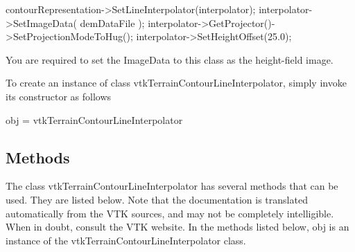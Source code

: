 \begin{DoxyVerb} contourRepresentation->SetLineInterpolator(interpolator);
 interpolator->SetImageData( demDataFile );
 interpolator->GetProjector()->SetProjectionModeToHug();
 interpolator->SetHeightOffset(25.0);\end{DoxyVerb}


You are required to set the Image\-Data to this class as the height-\/field image.

To create an instance of class vtk\-Terrain\-Contour\-Line\-Interpolator, simply invoke its constructor as follows \begin{DoxyVerb}  obj = vtkTerrainContourLineInterpolator
\end{DoxyVerb}
 \hypertarget{vtkwidgets_vtkxyplotwidget_Methods}{}\subsection{Methods}\label{vtkwidgets_vtkxyplotwidget_Methods}
The class vtk\-Terrain\-Contour\-Line\-Interpolator has several methods that can be used. They are listed below. Note that the documentation is translated automatically from the V\-T\-K sources, and may not be completely intelligible. When in doubt, consult the V\-T\-K website. In the methods listed below, {\ttfamily obj} is an instance of the vtk\-Terrain\-Contour\-Line\-Interpolator class. 
